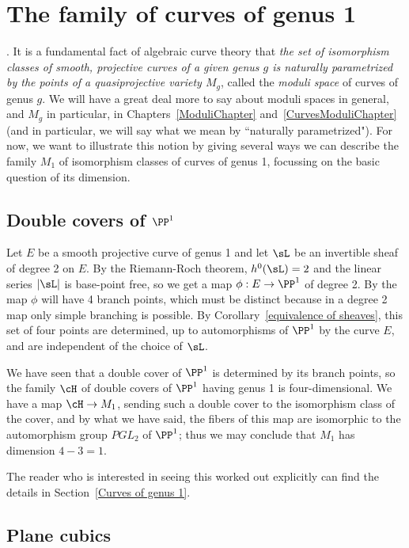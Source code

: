 \section{The family of curves of genus 1}. It is a fundamental fact of algebraic curve theory that \emph{the set of isomorphism classes of smooth, projective curves of a given genus $g$ is naturally parametrized by the points of a quasiprojective variety $M_g$}, called the \emph{moduli space} of curves of genus $g$. We will have a great deal more to say about moduli spaces in general, and $M_g$ in particular, in Chapters~\ref{ModuliChapter} and~\ref{CurvesModuliChapter} (and in particular, we will say what we mean by ``naturally parametrized"). For now, we want to illustrate this notion by giving several ways we can describe the family $M_1$ of isomorphism classes of curves of genus 1, focussing on the basic question of its dimension.



\subsection{Double covers of $\PP^1$}

Let $E$ be a smooth projective curve of genus 1 and let  $\sL$ be an invertible sheaf of degree 2 on $E$. By the Riemann-Roch theorem, $h^0(\sL) = 2$ and the linear series $|\sL|$ is base-point free, so we get a map $\phi : E \to \PP^1$ of degree 2. By \trh the map $\phi$ will have 4 branch points, which must be distinct because in a degree 2 map
only simple branching is possible. By Corollary~\ref{equivalence of sheaves}, this set of four points are determined, up to automorphisms of $\PP^1$ by the curve $E$, and are independent of the choice of $\sL$.

We have seen that a double cover of $\PP^1$ is determined by  its branch points, so the family $\cH$ of double covers of $\PP^1$ having genus 1 is four-dimensional. We have a map $\cH \to M_1$, sending such a double cover to the isomorphism class of the cover, and by what we have said, the fibers of this map are isomorphic to the automorphism group $PGL_2$ of $\PP^1$; thus we may conclude that $M_1$ has dimension $4-3=1$.

The reader who is interested in seeing this worked out explicitly can find the details in Section~\ref{Curves of genus 1}.

\subsection{Plane cubics}

